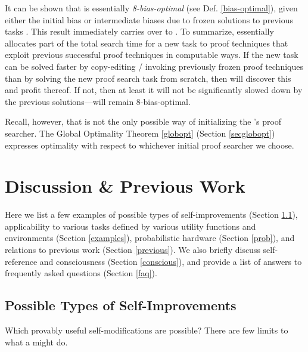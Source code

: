 It can be shown that \Oops is
essentially {\em 8-bias-optimal} (see Def. \ref{bias-optimal}),
given either the initial bias or intermediate biases due to
frozen solutions to previous tasks
\cite{Schmidhuber:04oops}.
This result immediately carries over to \Biopsn.
To summarize, \Biops essentially allocates part of the total search
time for a new task to proof techniques that exploit previous successful
proof techniques in computable ways.  If the new task can be solved faster
by copy-editing / invoking previously frozen
proof techniques than by solving the new proof search task from scratch,
then  \Biops will discover this and profit thereof. If not, then
at least it will not be significantly slowed down by the previous
solutions---\Biops will remain 8-bias-optimal.
 
 Recall, however, that \Biops is not the only
 possible way of initializing the \gmn's proof searcher.
The Global Optimality Theorem \ref{globopt} 
(Section \ref{secglobopt})
expresses optimality with respect to whichever
initial proof searcher we choose.


\section{Discussion \& Previous Work}
\label{discussion}


Here we list a few examples of
possible types of self-improvements
(Section \ref{possible}),
\gm applicability to various tasks defined by various utility functions and
environments
(Section \ref{examples}),
probabilistic hardware 
(Section \ref{prob}),
and relations to previous work
(Section \ref{previous}).
We also briefly discuss self-reference 
and consciousness 
(Section \ref{conscious}),
and provide a list
of answers to frequently asked questions 
(Section \ref{faq}).

\subsection{Possible Types of \GM Self-Improvements}
\label{possible}
 
  
  Which provably useful self-modifications are possible?
  There are few limits to what a \gm  might do.
   
